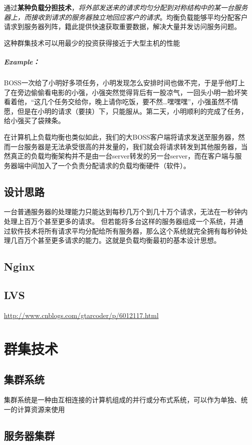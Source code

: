 \documentclass[UTF8,a4paper,12pt]{ctexbook}
\begin{document}
			通过\textbf{某种负载分担技术}，\textit{将外部发送来的请求均匀分配到对称结构中的某一台服务器上，而接收到请求的服务器独立地回应客户的请求}。均衡负载能够平均分配客户请求到服务器列阵，籍此提供快速获取重要数据，解决大量并发访问服务问题。
			
			这种群集技术可以用最少的投资获得接近于大型主机的性能
		
		\subparagraph{Example：}
			BOSS一次给了小明好多项任务，小明发现怎么安排时间也做不完，于是乎他盯上了在旁边偷偷看电影的小强，小强突然觉得背后有一股凉气，一回头小明一脸坏笑看着他，“这几个任务交给你，晚上请你吃饭，要不然…嘿嘿嘿”，小强虽然不情愿，但是在小明的请求（要挟）下，只能服从。第二天，小明顺利的完成了任务，给小强买了袋辣条。
			
			在计算机上负载均衡也类似如此，我们的大BOSS客户端将请求发送至服务器，然而一台服务器是无法承受很高的并发量的，我们就会将请求转发到其他服务器，当然真正的负载均衡架构并不是由一台server转发的另一台server，而在客户端与服务器端中间加入了一个负责分配请求的负载均衡硬件（软件）。
		\subsection{设计思路}
			一台普通服务器的处理能力只能达到每秒几万个到几十万个请求，无法在一秒钟内处理上百万个甚至更多的请求。
			但若能将多台这样的服务器组成一个系统，并通过软件技术将所有请求平均分配给所有服务器，那么这个系统就完全拥有每秒钟处理几百万个甚至更多请求的能力。这就是负载均衡最初的基本设计思想。
	
		\subsection{Nginx}
		
		
		\subsection{LVS}
			\url{http://www.cnblogs.com/gtarcoder/p/6012117.html}
		
	\section{群集技术}		
		\subsection{集群系统}集群系统是一种由互相连接的计算机组成的并行或分布式系统，可以作为单独、统一的计算资源来使用
	
		\subsection{服务器集群}
	
\end{document}
